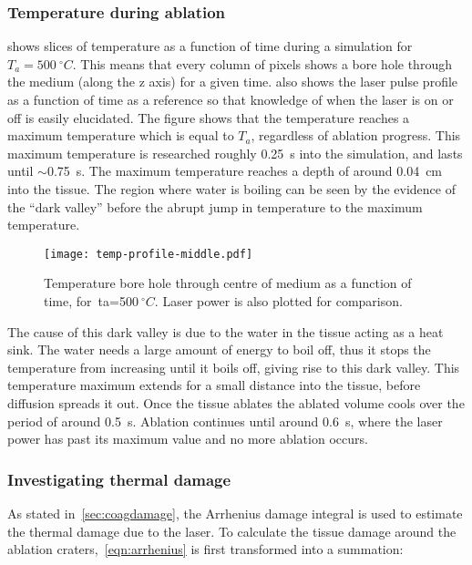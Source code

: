 \subsubsection*{Temperature during ablation}

 shows slices of temperature as a function of time during a simulation for $T_a=500~^{\circ}C$.
This means that every column of pixels shows a bore hole through the medium (along the z axis) for a given time.
 also shows the laser pulse profile as a function of time as a reference so that knowledge of when the laser is on or off is easily elucidated.
The figure shows that the temperature reaches a maximum temperature which is equal to $T_a$, regardless of ablation progress.
This maximum temperature is researched roughly 0.25~s into the simulation, and lasts until $\sim$0.75~s.
The maximum temperature reaches a depth of around 0.04~cm into the tissue.
The region where water is boiling can be seen by the evidence of the ``dark valley'' before the abrupt jump in temperature to the maximum temperature.
\begin{figure}[!htbp]
	\centering
	\texttt{[image: temp-profile-middle.pdf]}
	\caption{Temperature bore hole through centre of medium as a function of time, for~\gls*{ta}=500$~^{\circ}C$. Laser power is also plotted for comparison.}
	\label{fig:temp-500profile}
\end{figure}

The cause of this dark valley is due to the water in the tissue acting as a heat sink.
The water needs a large amount of energy to boil off, thus it stops the temperature from increasing until it boils off, giving rise to this dark valley.
This temperature maximum extends for a small distance into the tissue, before diffusion spreads it out.
Once the tissue ablates the ablated volume cools over the period of around 0.5~s.
Ablation continues until around 0.6~s, where the laser power has past its maximum value and no more ablation occurs.

\subsubsection*{Investigating thermal damage} 

As stated in~\cref{sec:coagdamage}, the Arrhenius damage integral is used to estimate the thermal damage due to the laser. To calculate the tissue damage around the ablation craters,~\cref{eqn:arrhenius} is first transformed into a summation:

